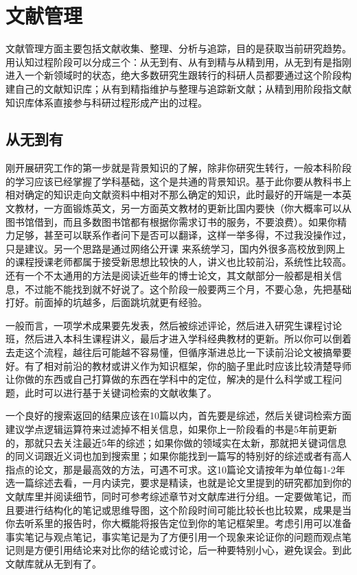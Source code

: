 \documentclass[]{tufte-book}
\begin{document}
\hypertarget{ux6587ux732eux7ba1ux7406}{%
\section{文献管理}\label{ux6587ux732eux7ba1ux7406}}

文献管理方面主要包括文献收集、整理、分析与追踪，目的是获取当前研究趋势。用认知过程阶段可以分成三个：从无到有、从有到精与从精到用，从无到有是指刚进入一个新领域时的状态，绝大多数研究生跟转行的科研人员都要通过这个阶段构建自己的文献知识库；从有到精指维护与整理与追踪新文献；从精到用阶段指文献知识库体系直接参与科研过程形成产出的过程。

\hypertarget{ux4eceux65e0ux5230ux6709}{%
\subsection{从无到有}\label{ux4eceux65e0ux5230ux6709}}

刚开展研究工作的第一步就是背景知识的了解，除非你研究生转行，一般本科阶段的学习应该已经掌握了学科基础，这个是共通的背景知识。基于此你要从教科书上相对确定的知识走向文献资料中相对不那么确定的知识，此时最好的开端是一本英文教材，一方面锻炼英文，另一方面英文教材的更新比国内要快（你大概率可以从图书馆借到，而且多数图书馆都有根据你需求订书的服务，不要浪费）。如果你精力足够，甚至可以联系作者问下是否可以翻译，这样一举多得，不过我没操作过，只是建议。另一个思路是通过网络公开课 来系统学习，国内外很多高校放到网上的课程授课老师都属于接受新思想比较快的人，讲义也比较前沿，系统性比较高。还有一个不太通用的方法是阅读近些年的博士论文，其文献部分一般都是相关信息，不过能不能找到就不好说了。这个阶段一般要两三个月，不要心急，先把基础打好。前面掉的坑越多，后面跳坑就更有经验。

一般而言，一项学术成果要先发表，然后被综述评论，然后进入研究生课程讨论班，然后进入本科生课程讲义，最后才进入学科经典教材的更新。所以你可以倒着去走这个流程，越往后可能越不容易懂，但循序渐进总比一下读前沿论文被搞晕要好。有了相对前沿的教材或讲义作为知识框架，你的脑子里此时应该比较清楚导师让你做的东西或自己打算做的东西在学科中的定位，解决的是什么科学或工程问题，此时可以进行基于关键词检索的文献收集了。

一个良好的搜索返回的结果应该在10篇以内，首先要是综述，然后关键词检索方面建议学点逻辑运算符来过滤掉不相关信息，如果你上一阶段看的书是5年前更新的，那就只去关注最近5年的综述；如果你做的领域实在太新，那就把关键词信息的同义词跟近义词也加到搜索里；如果你能找到一篇写的特别好的综述或者有高人指点的论文，那是最高效的方法，可遇不可求。这10篇论文请按年为单位每1-2年选一篇综述去看，一月内读完，要求是精读，也就是论文里提到的研究都加到你的文献库里并阅读细节，同时可参考综述章节对文献库进行分组。一定要做笔记，而且要进行结构化的笔记或思维导图，这个阶段时间可能比较长也比较累，成果是当你去听系里的报告时，你大概能将报告定位到你的笔记框架里。考虑引用可以准备事实笔记与观点笔记，事实笔记是为了方便引用一个现象来论证你的问题而观点笔记则是方便引用结论来对比你的结论或讨论，后一种要特别小心，避免误会。到此文献库就从无到有了。
\end{document}

